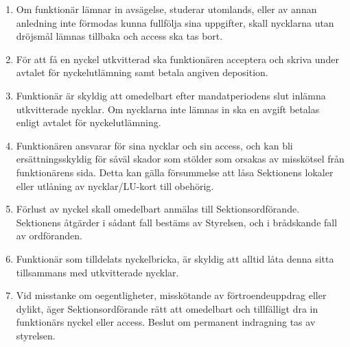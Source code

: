 \documentclass[../_main/handlingar.tex]{subfiles}
\begin{document}
\begin{enumerate}[label=\S\arabic*.]
	\item Om funktionär lämnar in avsägelse, studerar utomlands, eller av annan anledning inte förmodas kunna fullfölja sina uppgifter, skall nycklarna utan dröjsmål lämnas tillbaka och access ska tas bort.
	\item För att få en nyckel utkvitterad ska funktionären acceptera och skriva under avtalet för nyckelutlämning samt betala angiven deposition.
	\item Funktionär är skyldig att omedelbart efter mandatperiodens slut inlämna utkvitterade nycklar. Om nycklarna inte lämnas in ska en avgift betalas enligt avtalet för nyckelutlämning.
	\item Funktionären ansvarar för sina nycklar och sin access, och kan bli ersättningsskyldig för såväl skador som stölder som orsakas av misskötsel från funktionärens sida. Detta kan gälla försummelse att låsa Sektionens lokaler eller utlåning av nycklar/LU-kort till obehörig.
	\item Förlust av nyckel skall omedelbart anmälas till Sektionsordförande. Sektionens åtgärder i sådant fall bestäms av Styrelsen, och i brådskande fall av ordföranden.
	\item Funktionär som tilldelats nyckelbricka, är skyldig att alltid låta denna sitta tillsammans med utkvitterade nycklar.
	\item Vid misstanke om oegentligheter, misskötande av förtroendeuppdrag eller dylikt, äger Sektionsordförande rätt att omedelbart och tillfälligt dra in funktionärs nyckel eller access. Beslut om permanent indragning tas av styrelsen.
\end{enumerate}
\newpage
\end{document}
